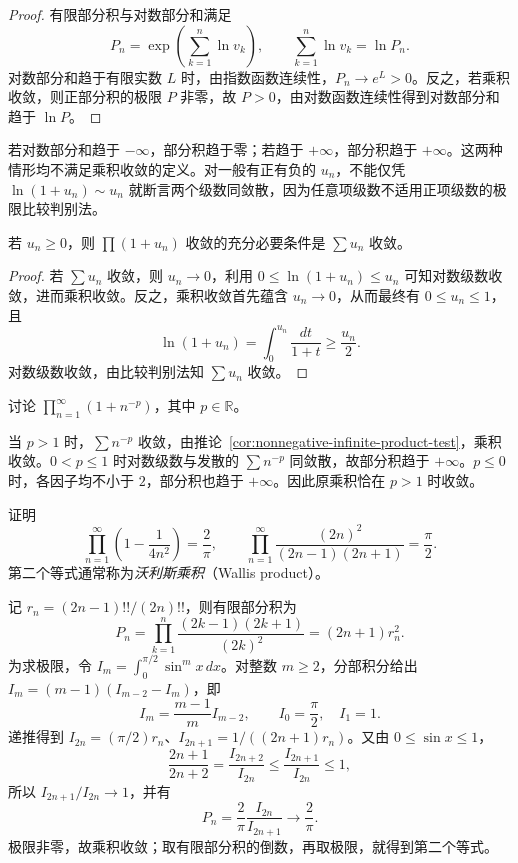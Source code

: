 \documentclass[UTF8,12pt,a4paper,fontset=fandol]{ctexbook}
\begin{document}
\begin{proof}
有限部分积与对数部分和满足
\[
    P_n=\exp\left(\sum_{k=1}^n\ln v_k\right),\qquad
    \sum_{k=1}^n\ln v_k=\ln P_n.
\]
对数部分和趋于有限实数 $L$ 时，由指数函数连续性，$P_n\to e^L>0$。反之，若乘积收敛，则正部分积的极限 $P$ 非零，故 $P>0$，由对数函数连续性得到对数部分和趋于 $\ln P$。
\end{proof}

若对数部分和趋于 $-\infty$，部分积趋于零；若趋于 $+\infty$，部分积趋于 $+\infty$。这两种情形均不满足乘积收敛的定义。对一般有正有负的 $u_n$，不能仅凭 $\ln(1+u_n)\sim u_n$ 就断言两个级数同敛散，因为任意项级数不适用正项级数的极限比较判别法。

\begin{corollary}
\label{cor:nonnegative-infinite-product-test}
若 $u_n\geq0$，则 $\prod(1+u_n)$ 收敛的充分必要条件是 $\sum u_n$ 收敛。
\end{corollary}

\begin{proof}
若 $\sum u_n$ 收敛，则 $u_n\to0$，利用 $0\leq\ln(1+u_n)\leq u_n$ 可知对数级数收敛，进而乘积收敛。反之，乘积收敛首先蕴含 $u_n\to0$，从而最终有 $0\leq u_n\leq1$，且
\[
    \ln(1+u_n)=\int_0^{u_n}\frac{dt}{1+t}\geq\frac{u_n}{2}.
\]
对数级数收敛，由比较判别法知 $\sum u_n$ 收敛。
\end{proof}

\begin{example}
\label{ex:infinite-product-p-power}
讨论 $\prod_{n=1}^{\infty}(1+n^{-p})$，其中 $p\in\mathbb R$。
\end{example}

\begin{solve}
当 $p>1$ 时，$\sum n^{-p}$ 收敛，由推论~\ref{cor:nonnegative-infinite-product-test}，乘积收敛。$0<p\leq1$ 时对数级数与发散的 $\sum n^{-p}$ 同敛散，故部分积趋于 $+\infty$。$p\leq0$ 时，各因子均不小于 $2$，部分积也趋于 $+\infty$。因此原乘积恰在 $p>1$ 时收敛。
\end{solve}

\begin{example}
\label{ex:wallis-infinite-product}
证明
\begin{equation}
    \prod_{n=1}^{\infty}\left(1-\frac1{4n^2}\right)=\frac2\pi,
    \qquad
    \prod_{n=1}^{\infty}\frac{(2n)^2}{(2n-1)(2n+1)}=\frac\pi2.
    \label{eq:wallis-infinite-product}
\end{equation}
第二个等式通常称为\emph{沃利斯乘积}（Wallis product）。
\end{example}

\begin{solve}
记 $r_n=(2n-1)!!/(2n)!!$，则有限部分积为
\[
    P_n=\prod_{k=1}^n\frac{(2k-1)(2k+1)}{(2k)^2}
       =(2n+1)r_n^2.
\]
为求极限，令 $I_m=\int_0^{\pi/2}\sin^m x\,dx$。对整数 $m\geq2$，分部积分给出 $I_m=(m-1)(I_{m-2}-I_m)$，即
\[
    I_m=\frac{m-1}{m}I_{m-2},\qquad I_0=\frac\pi2,\quad I_1=1.
\]
递推得到 $I_{2n}=(\pi/2)r_n$、$I_{2n+1}=1/((2n+1)r_n)$。又由 $0\leq\sin x\leq1$，
\[
    \frac{2n+1}{2n+2}
       =\frac{I_{2n+2}}{I_{2n}}
       \leq\frac{I_{2n+1}}{I_{2n}}\leq1,
\]
所以 $I_{2n+1}/I_{2n}\to1$，并有
\[
    P_n=\frac2\pi\frac{I_{2n}}{I_{2n+1}}\longrightarrow\frac2\pi.
\]
极限非零，故乘积收敛；取有限部分积的倒数，再取极限，就得到第二个等式。
\end{solve}
\end{document}
